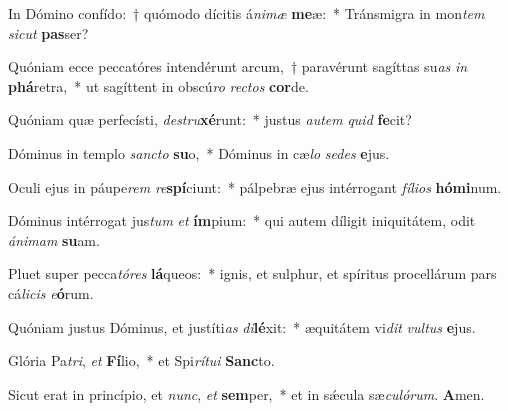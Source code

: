 \item In Dómino confído:~† quómodo dícitis á\textit{ni}\textit{mæ} \textbf{me}æ:~* Tránsmigra in mon\textit{tem} \textit{sic}\textit{ut} \textbf{pas}ser?
\item Quóniam ecce peccatóres intendérunt arcum,~† paravérunt sagíttas su\textit{as} \textit{in} \textbf{phá}retra,~* ut sagíttent in obscú\textit{ro} \textit{rec}\textit{tos} \textbf{cor}de.
\item Quóniam quæ perfecísti, \textit{de}\textit{stru}\textbf{xé}runt:~* justus \textit{au}\textit{tem} \textit{quid} \textbf{fe}cit?
\item Dóminus in templo \textit{sanc}\textit{to} \textbf{su}o,~* Dóminus in cæ\textit{lo} \textit{se}\textit{des} \textbf{e}jus.
\item Oculi ejus in páupe\textit{rem} \textit{re}\textbf{spí}ciunt:~* pálpebræ ejus intérrogant \textit{fí}\textit{li}\textit{os} \textbf{hó}\textbf{mi}num.
\item Dóminus intérrogat jus\textit{tum} \textit{et} \textbf{ím}pium:~* qui autem díligit iniquitátem, odit \textit{á}\textit{ni}\textit{mam} \textbf{su}am.
\item Pluet super pecca\textit{tó}\textit{res} \textbf{lá}queos:~* ignis, et sulphur, et spíritus procellárum pars cá\textit{li}\textit{cis} \textit{e}\textbf{ó}rum.
\item Quóniam justus Dóminus, et justíti\textit{as} \textit{di}\textbf{lé}xit:~* æquitátem vi\textit{dit} \textit{vul}\textit{tus} \textbf{e}jus.
\item Glória Pa\textit{tri}, \textit{et} \textbf{Fí}lio,~* et Spi\textit{rí}\textit{tu}\textit{i} \textbf{Sanc}to.
\item Sicut erat in princípio, et \textit{nunc}, \textit{et} \textbf{sem}per,~* et in sǽcula sæ\textit{cu}\textit{ló}\textit{rum}. \textbf{A}men.
